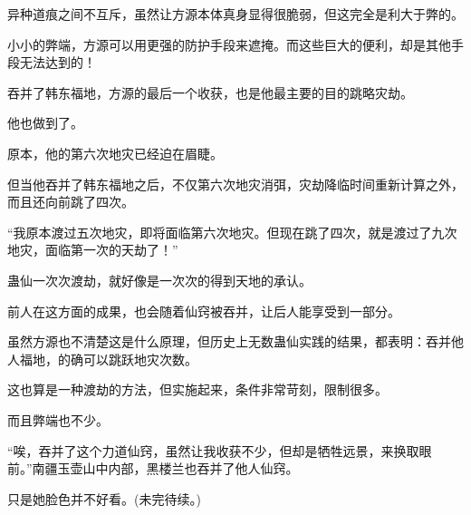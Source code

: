 \begin{this_body}
异种道痕之间不互斥，虽然让方源本体真身显得很脆弱，但这完全是利大于弊的。

小小的弊端，方源可以用更强的防护手段来遮掩。而这些巨大的便利，却是其他手段无法达到的！

吞并了韩东福地，方源的最后一个收获，也是他最主要的目的跳略灾劫。

他也做到了。

原本，他的第六次地灾已经迫在眉睫。

但当他吞并了韩东福地之后，不仅第六次地灾消弭，灾劫降临时间重新计算之外，而且还向前跳了四次。

“我原本渡过五次地灾，即将面临第六次地灾。但现在跳了四次，就是渡过了九次地灾，面临第一次的天劫了！”

蛊仙一次次渡劫，就好像是一次次的得到天地的承认。

前人在这方面的成果，也会随着仙窍被吞并，让后人能享受到一部分。

虽然方源也不清楚这是什么原理，但历史上无数蛊仙实践的结果，都表明：吞并他人福地，的确可以跳跃地灾次数。

这也算是一种渡劫的方法，但实施起来，条件非常苛刻，限制很多。

而且弊端也不少。

“唉，吞并了这个力道仙窍，虽然让我收获不少，但却是牺牲远景，来换取眼前。”南疆玉壶山中内部，黑楼兰也吞并了他人仙窍。

只是她脸色并不好看。(未完待续。)

\end{this_body}

